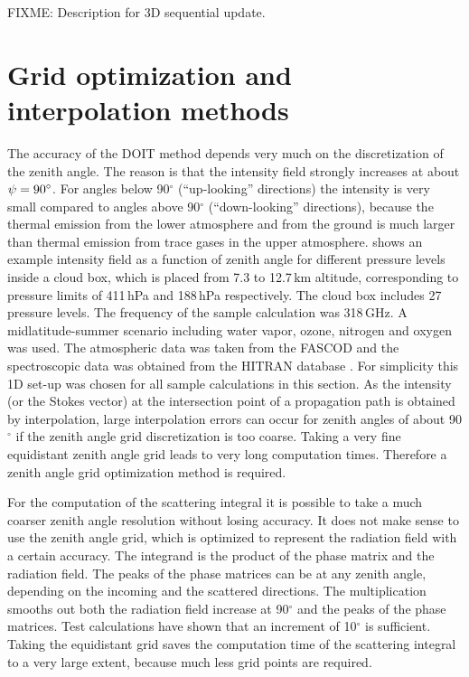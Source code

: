 FIXME: Description for 3D sequential update.

\section{Grid optimization and interpolation methods}
\label{sec:scattering:grid_opt_interp}

The accuracy of the DOIT method depends very much on the
discretization of the zenith angle. The reason is that the intensity
field strongly increases at about $\psi=90^\circ$. For angles
below 90$^\circ$ (``up-looking'' directions) the intensity is very
small compared to angles above 90$^\circ$ (``down-looking''
directions), because the thermal emission from the lower atmosphere
and from the ground is much larger than thermal emission from trace
gases in the upper atmosphere.  shows an
example intensity field as a function of zenith angle for different
pressure levels inside a cloud box, which is placed from 7.3 to 12.7\,km
altitude, corresponding to pressure limits of 411\,hPa and 188\,hPa
respectively. The cloud box includes 27 pressure levels. The frequency
of the sample calculation was 318\,GHz. A midlatitude-summer scenario
including water vapor, ozone, nitrogen and oxygen was used.
The atmospheric data was taken from the FASCOD \citep{anderson:86}
and the spectroscopic data was obtained from the HITRAN database
\citep{rothman:98}. For simplicity 
this 1D set-up was chosen for all sample calculations in this section.  As the
intensity (or the Stokes vector) at the intersection point of a
propagation path is obtained by interpolation, large interpolation
errors can occur for zenith angles of about 90$^\circ$ if the zenith
angle grid discretization is too coarse.  Taking a very fine
equidistant zenith angle grid leads to very long computation times.
Therefore a zenith angle grid optimization method is required.

For the computation of the scattering integral it is possible to take
a much coarser zenith angle resolution without losing accuracy.  It
does not make sense to use the zenith angle grid, which is optimized
to represent the radiation field with a certain accuracy. The
integrand is the product of the phase matrix and the radiation field.
The peaks of the phase matrices can be at any zenith angle, depending
on the incoming and the scattered directions. The multiplication
smooths out both the radiation field increase at 90$^\circ$ and the
peaks of the phase matrices.  Test calculations have shown that an
increment of 10$^\circ$ is sufficient. Taking the equidistant grid
saves the computation time of the scattering integral to a very large
extent, because much less grid points are required.

